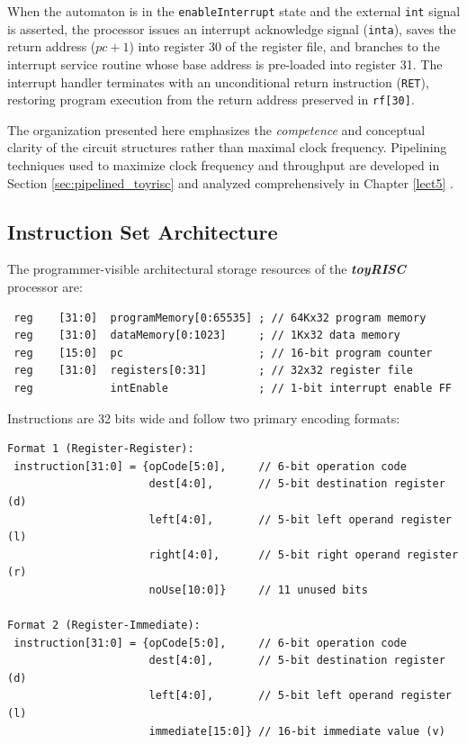 When the automaton is in the \texttt{enableInterrupt} state and the external \texttt{int} signal is asserted, the processor issues an interrupt acknowledge signal (\texttt{inta}), saves the return address ($pc + 1$) into register 30 of the register file, and branches to the interrupt service routine whose base address is pre-loaded into register 31. The interrupt handler terminates with an unconditional return instruction (\texttt{RET}), restoring program execution from the return address preserved in \texttt{rf[30]}.

\bigskip
The organization presented here emphasizes the \textit{competence} and conceptual clarity of the circuit structures rather than maximal clock frequency. Pipelining techniques used to maximize clock frequency and throughput are developed in Section \ref{sec:pipelined_toyrisc} and analyzed comprehensively in Chapter \ref{lect5} \cite{Hennessy19, Patterson19}.

\subsection{Instruction Set Architecture}\label{sec:toyrisc_isa}

The programmer-visible architectural storage resources of the \textbf{\textit{toyRISC}} processor are:
\begin{verbatim}
 reg    [31:0]  programMemory[0:65535] ; // 64Kx32 program memory
 reg    [31:0]  dataMemory[0:1023]     ; // 1Kx32 data memory
 reg    [15:0]  pc                     ; // 16-bit program counter
 reg    [31:0]  registers[0:31]        ; // 32x32 register file
 reg            intEnable              ; // 1-bit interrupt enable FF
\end{verbatim}

Instructions are 32 bits wide and follow two primary encoding formats:
\begin{verbatim}
Format 1 (Register-Register):
 instruction[31:0] = {opCode[5:0],     // 6-bit operation code
                      dest[4:0],       // 5-bit destination register (d)
                      left[4:0],       // 5-bit left operand register (l)
                      right[4:0],      // 5-bit right operand register (r)
                      noUse[10:0]}     // 11 unused bits

Format 2 (Register-Immediate):
 instruction[31:0] = {opCode[5:0],     // 6-bit operation code
                      dest[4:0],       // 5-bit destination register (d)
                      left[4:0],       // 5-bit left operand register (l)
                      immediate[15:0]} // 16-bit immediate value (v)
\end{verbatim}

